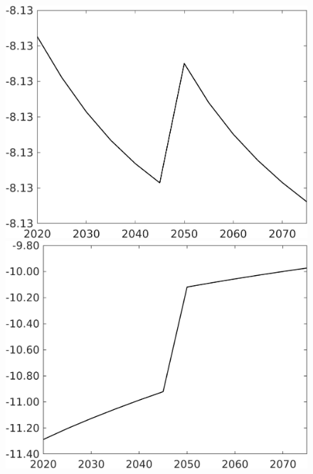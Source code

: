 \documentclass[12pt]{article}
\begin{document}
\begin{figure}[h!!]
\begin{minipage}[]{0.32\textwidth}
	\end{minipage}
	\begin{minipage}[]{0.32\textwidth}
		\includegraphics[width=1\textwidth]{../../codding_model/own_basedOnFried/optimalPol_010922_revision/figures/all_13Sept22/CompTaufPER_bytaul_Reg0_Ln_spillover0_nsk1_xgr0_knspil0_sep0_LFlimit1_emsbase0_countec0_GovRev0_etaa0.79_lgd0.png}
	\end{minipage}			
	\begin{minipage}[]{0.32\textwidth}
		\includegraphics[width=1\textwidth]{../../codding_model/own_basedOnFried/optimalPol_010922_revision/figures/all_13Sept22/CompTaufPER_bytaul_Reg0_GFF_spillover0_nsk1_xgr0_knspil0_sep0_LFlimit1_emsbase0_countec0_GovRev0_etaa0.79_lgd0.png}

\end{minipage}
\end{figure}
\end{document}
